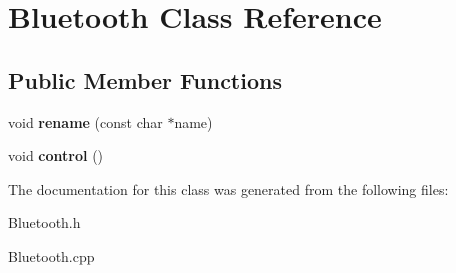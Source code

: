 \hypertarget{class_bluetooth}{}\section{Bluetooth Class Reference}
\label{class_bluetooth}
\subsection*{Public Member Functions}
\begin{DoxyCompactItemize}
\item 
\mbox{\label{class_bluetooth_a13f5e5d1fda538635921f86d79e3499f}} 
void {\bfseries rename} (const char $\ast$name)
\item 
\mbox{\label{class_bluetooth_a130166e793fa6ea032fa7615c0aa9ff3}} 
void {\bfseries control} ()
\end{DoxyCompactItemize}


The documentation for this class was generated from the following files\+:\begin{DoxyCompactItemize}
\item 
Bluetooth.\+h\item 
Bluetooth.\+cpp\end{DoxyCompactItemize}
